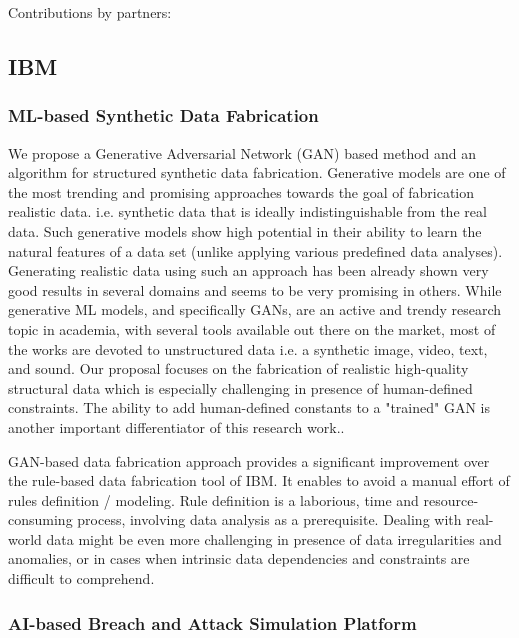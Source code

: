 \documentclass[a4paper,11pt]{article}
\begin{document}

Contributions by partners:

\subsection{IBM}
\subsubsection{ML-based Synthetic Data Fabrication}
 
We propose a Generative Adversarial Network (GAN) based method and an algorithm for structured synthetic data fabrication. Generative models are one of the most trending and promising approaches towards the goal of fabrication realistic data. i.e. synthetic data that is ideally indistinguishable from the real data. Such generative models show high potential in their ability to learn the natural features of a data set (unlike applying various predefined data analyses). Generating realistic data using such an approach has been already shown very good results in several domains and seems to be very promising in others. While generative ML models, and specifically GANs, are an active and trendy research topic in academia, with several tools available out there on the market, most of the works are devoted to unstructured data i.e. a synthetic image, video, text, and sound. Our proposal focuses on the fabrication of realistic high-quality structural data which is especially challenging in presence of human-defined constraints. The ability to add human-defined constants to a "trained" GAN is another important differentiator of this research work..
 
GAN-based data fabrication approach provides a significant improvement over the rule-based data fabrication tool of IBM. It enables to avoid a manual effort of rules definition / modeling. Rule definition is a laborious, time and resource-consuming process, involving data analysis as a prerequisite. Dealing with real-world data might be even more challenging in presence of data irregularities and anomalies, or in cases when intrinsic data dependencies and constraints are difficult to comprehend.

\subsubsection{AI-based Breach and Attack Simulation Platform}
\end{document}
